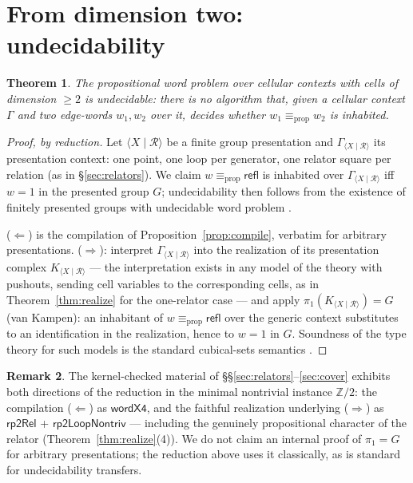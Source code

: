 \documentclass[11pt]{amsart}
\newtheorem{thm}{Theorem}[section]
\theoremstyle{definition}
\newtheorem{rem}[thm]{Remark}
\newcommand{\propeq}{\equiv_{\mathrm{prop}}}
\newcommand{\refl}{\mathsf{refl}}
\begin{document}
\section{From dimension two: undecidability}
\label{sec:undec}

\begin{thm}
  \label{thm:undec}
  The propositional word problem over cellular contexts with cells
  of dimension $\geq 2$ is undecidable: there is no algorithm that,
  given a cellular context $\Gamma$ and two edge-words $w_1, w_2$
  over it, decides whether $w_1 \propeq w_2$ is inhabited.
\end{thm}

\begin{proof}[Proof, by reduction]
  Let $\langle X \mid \mathcal{R} \rangle$ be a finite group
  presentation and $\Gamma_{\langle X \mid \mathcal{R}\rangle}$ its
  presentation context: one point, one loop per generator, one
  relator square per relation (as in \S\ref{sec:relators}).  We
  claim $w \propeq \refl$ is inhabited over
  $\Gamma_{\langle X \mid \mathcal{R}\rangle}$ iff $w = 1$ in the
  presented group $G$; undecidability then follows from the
  existence of finitely presented groups with undecidable word
  problem \cite{Novikov,Boone}.

  ($\Leftarrow$) is the compilation of
  Proposition~\ref{prop:compile}, verbatim for arbitrary
  presentations.  ($\Rightarrow$): interpret
  $\Gamma_{\langle X \mid \mathcal{R}\rangle}$ into the realization
  of its presentation complex $K_{\langle X \mid \mathcal{R}\rangle}$
  --- the interpretation exists in any model of the theory with
  pushouts, sending cell variables to the corresponding cells, as in
  Theorem~\ref{thm:realize} for the one-relator case --- and apply
  $\pi_1(K_{\langle X \mid \mathcal{R}\rangle}) = G$ (van Kampen):
  an inhabitant of $w \propeq \refl$ over the generic context
  substitutes to an identification in the realization, hence to
  $w = 1$ in $G$.  Soundness of the type theory for such models is
  the standard cubical-sets semantics \cite{CCHM}.
\end{proof}

\begin{rem}
  The kernel-checked material of
  \S\S\ref{sec:relators}--\ref{sec:cover} exhibits both directions
  of the reduction in the minimal nontrivial instance
  $\mathbb{Z}/2$: the compilation ($\Leftarrow$) as
  $\mathsf{wordX4}$, and the faithful realization underlying
  ($\Rightarrow$) as
  $\mathsf{rp2Rel}$ + $\mathsf{rp2LoopNontriv}$ ---
  including the genuinely propositional character of the relator
  (Theorem~\ref{thm:realize}(4)).  We do not claim an internal
  proof of $\pi_1 = G$ for arbitrary presentations; the reduction
  above uses it classically, as is standard for undecidability
  transfers.
\end{rem}
\end{document}
